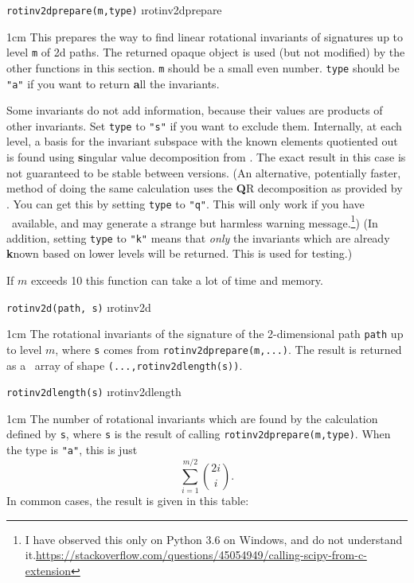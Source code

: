 \documentclass[a4paper]{extarticle}
\newenvironment{defn}{\begin{adjustwidth}{1cm}{}\ignorespaces}{\end{adjustwidth}\ignorespacesafterend}
\begin{document}
\verb!rotinv2dprepare(m,type)! \i{rotinv2dprepare}
\begin{defn}
	\nopagebreak This prepares the way to find linear rotational invariants of signatures up to level \verb|m| of 2d paths. The returned opaque object is used (but not modified) by the other functions in this section. \verb|m| should be a small even number. \verb|type| should be \verb|"a"| if you want to return \textbf{a}ll the invariants.
	
	Some invariants do not add information, because their values are products of other invariants. Set \verb|type| to \verb|"s"| if you want to exclude them. Internally, at each level, a basis for the invariant subspace with the known elements quotiented out is found using \textbf{s}ingular value decomposition from \numpy. The exact result in this case is not guaranteed to be stable between versions. (An alternative, potentially faster, method of doing the same calculation uses the \textbf{Q}R decomposition as provided by \scipy. You can get this by setting \verb|type| to \verb|"q"|. This will only work if you have \scipy\ available, and may generate a strange but harmless warning message.\footnote{I have observed this only on Python 3.6 on Windows, and do not understand it.\url{https://stackoverflow.com/questions/45054949/calling-scipy-from-c-extension}}) (In addition, setting \verb|type| to \verb|"k"| means that \emph{only} the invariants which are already \textbf{k}nown based on lower levels will be returned. This is used for testing.)
	
	If $m$ exceeds 10 this function can take a lot of time and memory.
\end{defn}
\verb!rotinv2d(path, s)! \i{rotinv2d}

\begin{defn}
	\nopagebreak The rotational invariants of the signature of the 2-dimensional path \verb|path| up to level $m$, where \verb!s! comes from \verb!rotinv2dprepare(m,...)!. The result is returned as a \numpy\ array of shape \verb!(...,rotinv2dlength(s))!.
\end{defn}
\verb!rotinv2dlength(s)! \i{rotinv2dlength}

\begin{defn}
	\nopagebreak The number of rotational invariants which are found by the calculation defined by \verb!s!, where \verb!s! is the result of calling \verb!rotinv2dprepare(m,type)!. When the type is \verb|"a"|, this is just \[\sum_{i=1}^{m/2}\binom{2i}{i}.\] 
	In common cases, the result is given in this table:
\end{defn}
\end{document}
